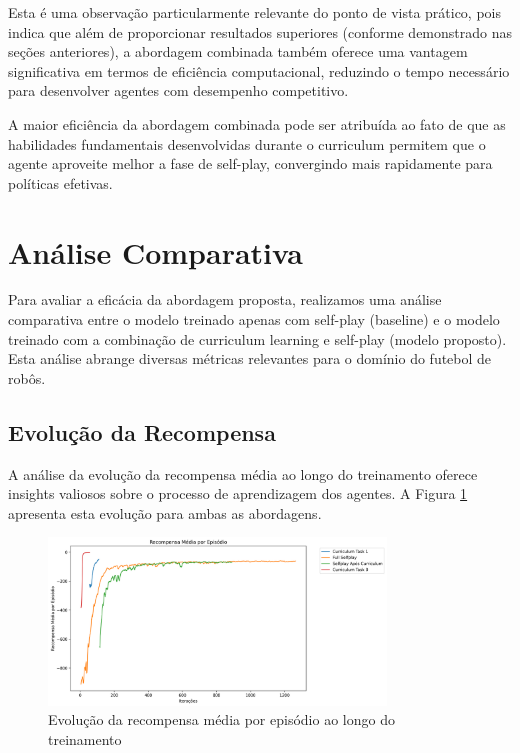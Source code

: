Esta é uma observação particularmente relevante do ponto de vista prático, pois indica que além de proporcionar resultados superiores (conforme demonstrado nas seções anteriores), a abordagem combinada também oferece uma vantagem significativa em termos de eficiência computacional, reduzindo o tempo necessário para desenvolver agentes com desempenho competitivo.

A maior eficiência da abordagem combinada pode ser atribuída ao fato de que as habilidades fundamentais desenvolvidas durante o curriculum permitem que o agente aproveite melhor a fase de self-play, convergindo mais rapidamente para políticas efetivas.

\section{Análise Comparativa}
\label{sec:analise_comparativa}

Para avaliar a eficácia da abordagem proposta, realizamos uma análise comparativa entre o modelo treinado apenas com self-play (baseline) e o modelo treinado com a combinação de curriculum learning e self-play (modelo proposto). Esta análise abrange diversas métricas relevantes para o domínio do futebol de robôs.

\subsection{Evolução da Recompensa}

A análise da evolução da recompensa média ao longo do treinamento oferece insights valiosos sobre o processo de aprendizagem dos agentes. A Figura \ref{fig:episode_reward} apresenta esta evolução para ambas as abordagens.

\begin{figure}[H]
    \centering
    \includegraphics[width=0.8\textwidth]{fig/graficos_trabalho/graficos_experimentos/geral/episode_reward_mean.png}
    \caption{Evolução da recompensa média por episódio ao longo do treinamento}
    \label{fig:episode_reward}
\end{figure}

